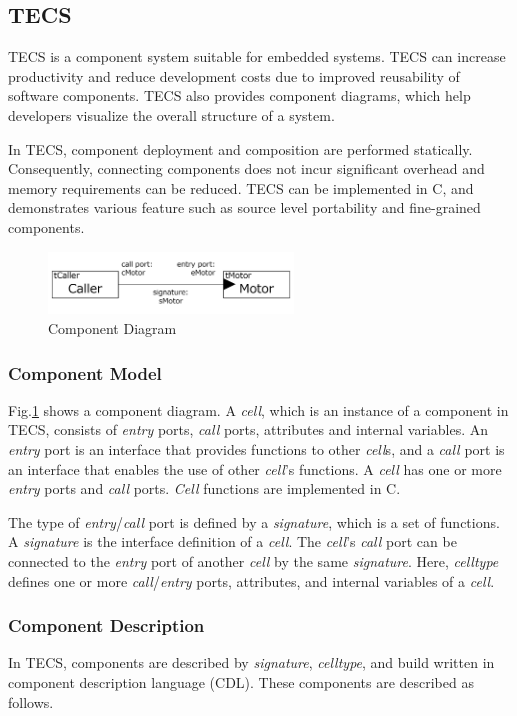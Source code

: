 \documentclass[JIP]{ipsj_v2/UTF8/ipsj}
\begin{document}
\subsection{TECS}
\label{sec:TECS}

TECS is a component system suitable for embedded systems.
TECS can increase productivity and reduce development costs due to improved reusability of software components.
TECS also provides component diagrams, which help developers visualize the overall structure of a system.

In TECS, component deployment and composition are performed statically.
Consequently, connecting components does not incur significant overhead and memory requirements can be reduced.
TECS can be implemented in C, and demonstrates various feature such as source level portability and fine-grained components.

\begin{figure}[t]
    \centering
    \includegraphics[width=6.5cm,clip]{figure/component_diagram.pdf}
    \caption{Component Diagram}
    \label{fig:component}
\end{figure}

\subsubsection{Component Model}
Fig.\ref{fig:component} shows a component diagram.
A {\it cell}, which is an instance of a component in TECS, consists of {\it entry} ports, {\it call} ports, attributes and internal variables.
An {\it entry} port is an interface that provides functions to other {\it cell}s, and a {\it call} port is an interface that enables the use of other {\it cell}'s functions.
A {\it cell} has one or more {\it entry} ports and {\it call} ports.
{\it Cell} functions are implemented in C.

The type of {\it entry}/{\it call} port is defined by a {\it signature}, which is a set of functions.
A {\it signature} is the interface definition of a {\it cell}.
The {\it cell}'s  {\it call} port can be connected to the {\it entry} port of another {\it cell} by the same {\it signature}.
Here, {\it celltype} defines one or more {\it call}/{\it entry} ports, attributes, and internal variables of a {\it cell}.


\subsubsection{Component Description}
In TECS, components are described by {\it signature}, {\it celltype}, and build written in component description language (CDL).
These components are described as follows.
\end{document}
